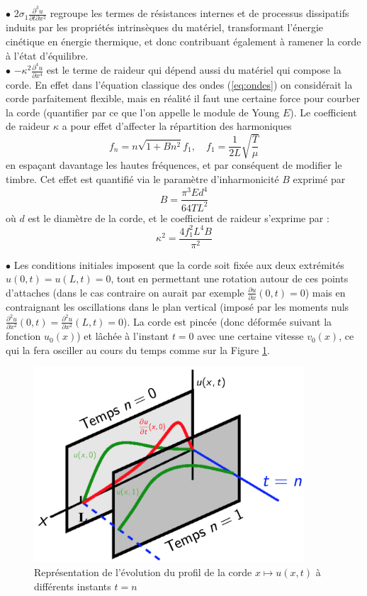 \documentclass[a4,12pt]{article}
\begin{document}
$\bullet$ $\displaystyle2\sigma_1  \frac{\partial^3 u}{\partial t\partial x^2}$ regroupe les termes de résistances internes et de processus dissipatifs induits par les propriétés intrinsèques du matériel, transformant l'énergie cinétique en énergie thermique, et donc contribuant également à ramener la corde à l'état d'équilibre.\\

$\bullet$ $\displaystyle-\kappa^2  \frac{\partial^4 u}{\partial x^4}$ est le terme de raideur qui dépend aussi du matériel qui compose la corde. En effet dans l'équation classique des ondes (\ref{eq:ondes}) on considérait la corde parfaitement flexible, mais en réalité il faut une certaine force pour courber la corde (quantifier par ce que l'on appelle le module de Young $E$). Le coefficient de raideur $\kappa$ a pour effet d'affecter la répartition des harmoniques 
\[
f_n = n \sqrt{1 + B n^2}f_1,\quad f_1=\frac{1}{2 L} \sqrt{\frac{T}{\mu}}
\]
en espaçant davantage les hautes fréquences, et par conséquent de modifier le timbre. Cet effet est quantifié via le paramètre d'inharmonicité $B$ exprimé par 
\[
B = \frac{\pi^3 E d^4}{64 T L^2}
\]
où $d$ est le diamètre de la corde, et le coefficient de raideur s'exprime par : 
\[
\kappa^2=\frac{4f_1^2L^4B}{\pi^2}
\]

$\bullet$ Les conditions initiales imposent que la corde soit fixée aux deux extrémités $u(0,t)=u(L,t)=0$, tout en permettant une rotation autour de ces points d'attaches (dans le cas contraire on aurait par exemple $\frac{\partial u}{\partial x}(0,t)=0$) mais en contraignant les oscillations dans le plan vertical (imposé par les moments nuls $\frac{\partial^2 u}{\partial x^2}(0,t)=\frac{\partial^2 u}{\partial x^2}(L,t)=0$). La corde est pincée (donc déformée suivant la fonction $u_0(x)$) et lâchée à l'instant $t=0$ avec une certaine vitesse $v_0(x)$, ce qui la fera osciller au cours du temps comme sur la Figure \ref{fig:profil}. \\

\begin{figure}
	\begin{center}
		\includegraphics[width=0.9\textwidth]{images/profils_corde.pdf}
		\caption{Représentation de l'évolution du profil de la corde $x\mapsto u(x,t)$ à différents instants $t=n$}
		\label{fig:profil}
	\end{center}
\end{figure}
\end{document}
